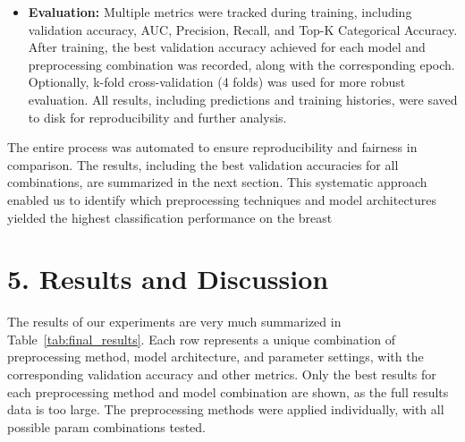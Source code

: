 \documentclass[12pt]{article}
\begin{document}
\begin{itemize}
    \item \textbf{Evaluation:} Multiple metrics were tracked during training, including validation accuracy, AUC, Precision, Recall, and Top-K Categorical Accuracy. After training, the best validation accuracy achieved for each model and preprocessing combination was recorded, along with the corresponding epoch. Optionally, k-fold cross-validation (4 folds) was used for more robust evaluation. All results, including predictions and training histories, were saved to disk for reproducibility and further analysis.
\end{itemize}

The entire process was automated to ensure reproducibility and fairness in comparison. The results, including the best validation accuracies for all combinations, are summarized in the next section. This systematic approach enabled us to identify which preprocessing techniques and model architectures yielded the highest classification performance on the breast

\section*{5. Results and Discussion}


The results of our experiments are very much summarized in Table~\ref{tab:final_results}. Each row represents a unique combination of preprocessing method, model architecture, and parameter settings, with the corresponding validation accuracy and other metrics. Only the best results for each preprocessing method and model combination are shown, as the full results data is too large. The preprocessing methods were applied individually, with all possible param combinations tested.
\end{document}
